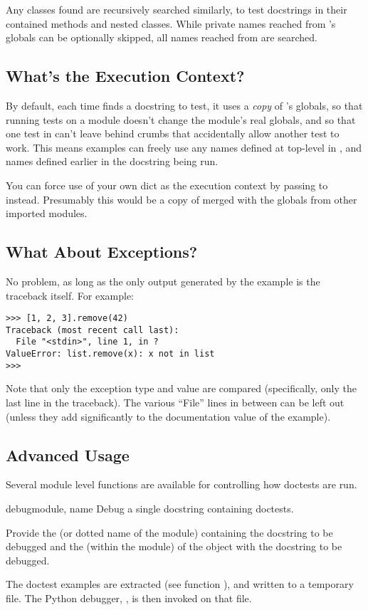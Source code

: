 Any classes found are recursively searched similarly, to test docstrings in
their contained methods and nested classes.  While private names reached
from 's globals can be optionally skipped, all names reached from
 are searched.

\subsection{What's the Execution Context?}

By default, each time  finds a docstring to test, it uses
a \emph{copy} of 's globals, so that running tests on a module
doesn't change the module's real globals, and so that one test in
 can't leave behind crumbs that accidentally allow another test
to work.  This means examples can freely use any names defined at top-level
in , and names defined earlier in the docstring being run.

You can force use of your own dict as the execution context by passing
 to  instead.  Presumably this
would be a copy of  merged with the globals from other
imported modules.

\subsection{What About Exceptions?}

No problem, as long as the only output generated by the example is the
traceback itself.  For example:

\begin{verbatim}
>>> [1, 2, 3].remove(42)
Traceback (most recent call last):
  File "<stdin>", line 1, in ?
ValueError: list.remove(x): x not in list
>>>
\end{verbatim}

Note that only the exception type and value are compared (specifically,
only the last line in the traceback).  The various ``File'' lines in
between can be left out (unless they add significantly to the documentation
value of the example).

\subsection{Advanced Usage}

Several module level functions are available for controlling how doctests
are run.

\begin{funcdesc}{debug}{module, name}
  Debug a single docstring containing doctests.

  Provide the  (or dotted name of the module) containing the
  docstring to be debugged and the  (within the module) of the
  object with the docstring to be debugged.

  The doctest examples are extracted (see function ),
  and written to a temporary file.  The Python debugger, ,
  is then invoked on that file.
\end{funcdesc}

